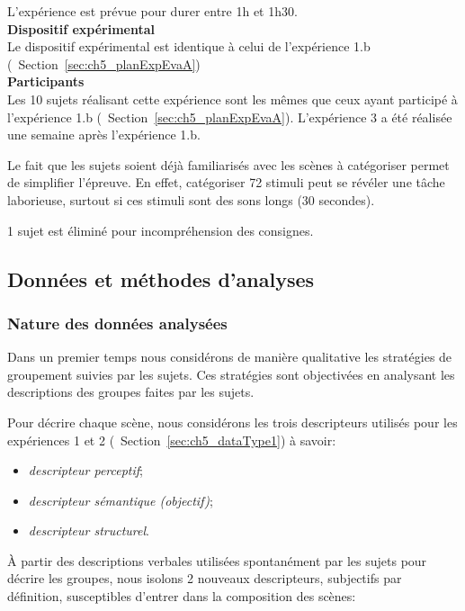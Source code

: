 L'expérience est prévue pour durer entre 1h et 1h30. \\

{\setlength{\parindent}{0cm}\textbf{Dispositif expérimental}} \\

Le dispositif expérimental est identique à celui de l'expérience 1.b (\cf~Section~\ref{sec:ch5_planExpEvaA}) \\

{\setlength{\parindent}{0cm}\textbf{Participants}} \\

Les 10 sujets réalisant cette expérience sont les mêmes que ceux ayant participé à l'expérience 1.b (\cf~Section~\ref{sec:ch5_planExpEvaA}). L'expérience 3 a été réalisée une semaine après l'expérience 1.b. 

Le fait que les sujets soient déjà familiarisés avec les scènes à catégoriser permet de simplifier l'épreuve. En effet, catégoriser 72 stimuli peut se révéler une tâche laborieuse, surtout si ces stimuli sont des sons longs (30 secondes).

1 sujet est éliminé pour incompréhension des consignes.

\subsection{Données et méthodes d'analyses}

\subsubsection{Nature des données analysées}
\label{sec:ch5_dataXp3}

Dans un premier temps nous considérons de manière qualitative les stratégies de groupement suivies par les sujets. Ces stratégies sont objectivées en analysant les descriptions des groupes faites par les sujets.

Pour décrire chaque scène, nous considérons les trois descripteurs utilisés pour les expériences 1 et 2 (\cf~Section~\ref{sec:ch5_dataType1}) à savoir:

\begin{itemize}
\item \emph{descripteur perceptif};
\item \emph{descripteur sémantique (objectif)};
\item \emph{descripteur structurel}.
\end{itemize}

À partir des descriptions verbales utilisées spontanément par les sujets pour décrire les groupes, nous isolons 2 nouveaux descripteurs, subjectifs par définition, susceptibles d'entrer dans la composition des scènes:

